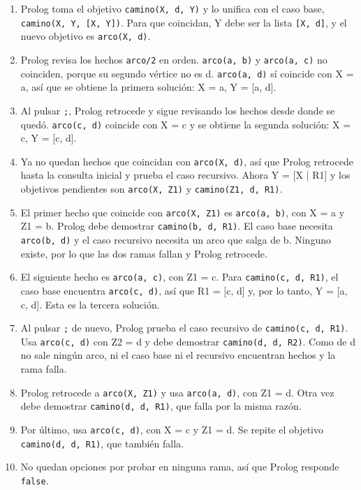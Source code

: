 \documentclass[12pt,letterpaper]{article}
\begin{document}
\begin{enumerate}
  \item Prolog toma el objetivo \texttt{camino(X, d, Y)} y lo unifica con el caso
  base, \texttt{camino(X, Y, [X, Y])}. Para que coincidan, Y debe ser la lista
  \texttt{[X, d]}, y el nuevo objetivo es \texttt{arco(X, d)}.
  \item Prolog revisa los hechos \texttt{arco/2} en orden. \texttt{arco(a, b)} y
  \texttt{arco(a, c)} no coinciden, porque su segundo vértice no es d.
  \texttt{arco(a, d)} sí coincide con X = a, así que se obtiene la primera
  solución: X = a, Y = [a, d].
  \item Al pulsar \texttt{;}, Prolog retrocede y sigue revisando los hechos desde
  donde se quedó. \texttt{arco(c, d)} coincide con X = c y se obtiene la segunda
  solución: X = c, Y = [c, d].
  \item Ya no quedan hechos que coincidan con \texttt{arco(X, d)}, así que Prolog
  retrocede hasta la consulta inicial y prueba el caso recursivo. Ahora
  Y = [X | R1] y los objetivos pendientes son \texttt{arco(X, Z1)} y
  \texttt{camino(Z1, d, R1)}.
  \item El primer hecho que coincide con \texttt{arco(X, Z1)} es \texttt{arco(a, b)},
  con X = a y Z1 = b. Prolog debe demostrar \texttt{camino(b, d, R1)}. El caso base
  necesita \texttt{arco(b, d)} y el caso recursivo necesita un arco que salga de b.
  Ninguno existe, por lo que las dos ramas fallan y Prolog retrocede.
  \item El siguiente hecho es \texttt{arco(a, c)}, con Z1 = c. Para
  \texttt{camino(c, d, R1)}, el caso base encuentra \texttt{arco(c, d)}, así que
  R1 = [c, d] y, por lo tanto, Y = [a, c, d]. Esta es la tercera solución.
  \item Al pulsar \texttt{;} de nuevo, Prolog prueba el caso recursivo de
  \texttt{camino(c, d, R1)}. Usa \texttt{arco(c, d)} con Z2 = d y debe demostrar
  \texttt{camino(d, d, R2)}. Como de d no sale ningún arco, ni el caso base ni el
  recursivo encuentran hechos y la rama falla.
  \item Prolog retrocede a \texttt{arco(X, Z1)} y usa \texttt{arco(a, d)}, con
  Z1 = d. Otra vez debe demostrar \texttt{camino(d, d, R1)}, que falla por la misma
  razón.
  \item Por último, usa \texttt{arco(c, d)}, con X = c y Z1 = d. Se repite el
  objetivo \texttt{camino(d, d, R1)}, que también falla.
  \item No quedan opciones por probar en ninguna rama, así que Prolog responde
  \texttt{false}.
\end{enumerate}
\end{document}
